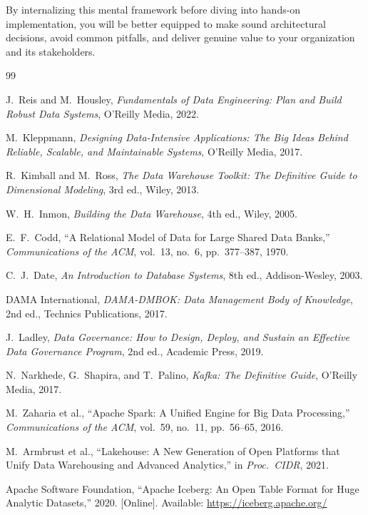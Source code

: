\documentclass{article}
\begin{document}
By internalizing this mental framework before diving into hands-on implementation, you will be better equipped to make sound architectural decisions, avoid common pitfalls, and deliver genuine value to your organization and its stakeholders.

\newpage

\begin{thebibliography}{99}

J.~Reis and M.~Housley, \textit{Fundamentals of Data Engineering: Plan and Build Robust Data Systems}, O'Reilly Media, 2022.

M.~Kleppmann, \textit{Designing Data-Intensive Applications: The Big Ideas Behind Reliable, Scalable, and Maintainable Systems}, O'Reilly Media, 2017.

R.~Kimball and M.~Ross, \textit{The Data Warehouse Toolkit: The Definitive Guide to Dimensional Modeling}, 3rd ed., Wiley, 2013.

W.~H.~Inmon, \textit{Building the Data Warehouse}, 4th ed., Wiley, 2005.

E.~F.~Codd, ``A Relational Model of Data for Large Shared Data Banks,'' \textit{Communications of the ACM}, vol.~13, no.~6, pp.~377--387, 1970.

C.~J.~Date, \textit{An Introduction to Database Systems}, 8th ed., Addison-Wesley, 2003.

DAMA International, \textit{DAMA-DMBOK: Data Management Body of Knowledge}, 2nd ed., Technics Publications, 2017.

J.~Ladley, \textit{Data Governance: How to Design, Deploy, and Sustain an Effective Data Governance Program}, 2nd ed., Academic Press, 2019.

N.~Narkhede, G.~Shapira, and T.~Palino, \textit{Kafka: The Definitive Guide}, O'Reilly Media, 2017.

M.~Zaharia et al., ``Apache Spark: A Unified Engine for Big Data Processing,'' \textit{Communications of the ACM}, vol.~59, no.~11, pp.~56--65, 2016.

M.~Armbrust et al., ``Lakehouse: A New Generation of Open Platforms that Unify Data Warehousing and Advanced Analytics,'' in \textit{Proc.~CIDR}, 2021.

Apache Software Foundation, ``Apache Iceberg: An Open Table Format for Huge Analytic Datasets,'' 2020. [Online]. Available: \url{https://iceberg.apache.org/}


\end{thebibliography}
\end{document}

